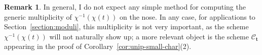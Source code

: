 \documentclass[11pt,reqno]{amsart}
\theoremstyle{definition}
\newtheorem{remark}[theorem]{Remark}
\newcommand{\bA}{{\mathbf A}}
\newcommand{\bt}{{\mathbf t}}
\newcommand{\sC}{{\mathscr C}}
\DeclareMathOperator{\GL}{GL}
\newcommand{\ov}[1]{\overline{#1}}
\begin{document}
\begin{remark}
    In general, I do not expect any simple method for computing the generic multiplicity of $\chi^{-1}(\chi(t))$ on the nose. In any case, for applications to Section~\ref{section:moduli}, this multiplicity is not very important, as the scheme $\chi^{-1}(\chi(t))$ will not naturally show up; a more relevant object is the scheme $\sC_{\bt}$ appearing in the proof of Corollary~\ref{cor:unip-small-char}(2).

\end{remark}
\end{document}
